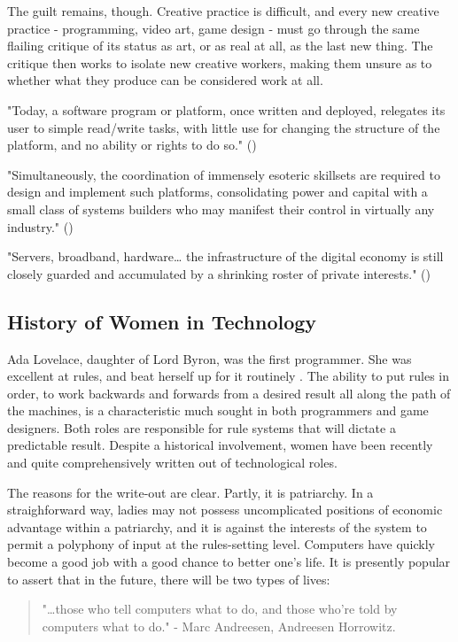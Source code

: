 The guilt remains, though. Creative practice is difficult, and every new creative practice - programming, video art, game design - must go through the same flailing critique of its status as art, or as real at all, as the last new thing. The critique then works to isolate new creative workers, making them unsure as to whether what they produce can be considered work at all.

"Today, a software program or platform, once written and deployed, relegates its user to simple read/write tasks, with little use for changing the structure of the platform, and no ability or rights to do so." (\cite{straddler})

"Simultaneously, the coordination of immensely esoteric skillsets are required to design and implement such platforms, consolidating power and capital with a small class of systems builders who may manifest their control in virtually any industry." (\cite{straddler})

"Servers, broadband, hardware… the infrastructure of the digital economy is still closely guarded and accumulated by a shrinking roster of private interests." (\cite{straddler})


\subsection{History of Women in Technology}

Ada Lovelace, daughter of Lord Byron, was the first programmer. She was excellent at rules, and beat herself up for it routinely \cite{plant}. The ability to put rules in order, to work backwards and forwards from a desired result all along the path of the machines, is a characteristic much sought in both programmers and game designers. Both roles are responsible for rule systems that will dictate a predictable result. Despite a historical involvement, women have been recently and quite comprehensively written out of technological roles.

The reasons for the write-out are clear. Partly, it is patriarchy. In a straighforward way, ladies may not possess uncomplicated positions of economic advantage within a patriarchy, and it is against the interests of the system to permit a polyphony of input at the rules-setting level. Computers have quickly become a good job with a good chance to better one's life. It is presently popular to assert that in the future, there will be two types of lives:
\begin{quote}
"…those who tell computers what to do, and those who’re told by computers what to do." - Marc Andreesen, Andreesen Horrowitz.
\end{quote}

